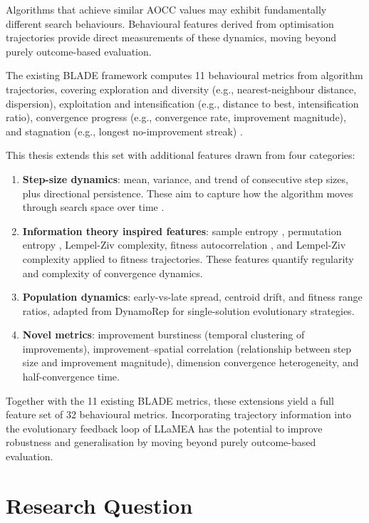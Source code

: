 \documentclass[12pt]{article}
\begin{document}
Algorithms that achieve similar AOCC values may exhibit fundamentally different search behaviours. Behavioural features derived from optimisation trajectories provide direct measurements of these dynamics, moving beyond purely outcome-based evaluation.

The existing BLADE framework computes 11 behavioural metrics from algorithm trajectories, covering exploration and diversity (e.g., nearest-neighbour distance, dispersion), exploitation and intensification (e.g., distance to best, intensification ratio), convergence progress (e.g., convergence rate, improvement magnitude), and stagnation (e.g., longest no-improvement streak) \cite{vanStein2025Behaviour}.

This thesis extends this set with additional features drawn from four categories:

\begin{enumerate}[leftmargin=2em]
  \item \textbf{Step-size dynamics}: mean, variance, and trend of consecutive step sizes, plus directional persistence. These aim to capture how the algorithm moves through search space over time \cite{cenikj2026features}.
  \item \textbf{Information theory inspired features}: sample entropy \cite{richman2000sampen}, permutation entropy \cite{bandt2002permutation}, Lempel-Ziv complexity, fitness autocorrelation \cite{weinberger1990fitness}, and Lempel-Ziv complexity applied to fitness trajectories. These features quantify regularity and complexity of convergence dynamics.
  \item \textbf{Population dynamics}: early-vs-late spread, centroid drift, and fitness range ratios, adapted from DynamoRep \cite{cenikj2023dynamorep} for single-solution evolutionary strategies.
  \item \textbf{Novel metrics}: improvement burstiness (temporal clustering of improvements), improvement--spatial correlation (relationship between step size and improvement magnitude), dimension convergence heterogeneity, and half-convergence time.
\end{enumerate}

Together with the 11 existing BLADE metrics, these extensions yield a full feature set of 32 behavioural metrics. Incorporating trajectory information into the evolutionary feedback loop of LLaMEA has the potential to improve robustness and generalisation by moving beyond purely outcome-based evaluation.


\section{Research Question}
\end{document}
